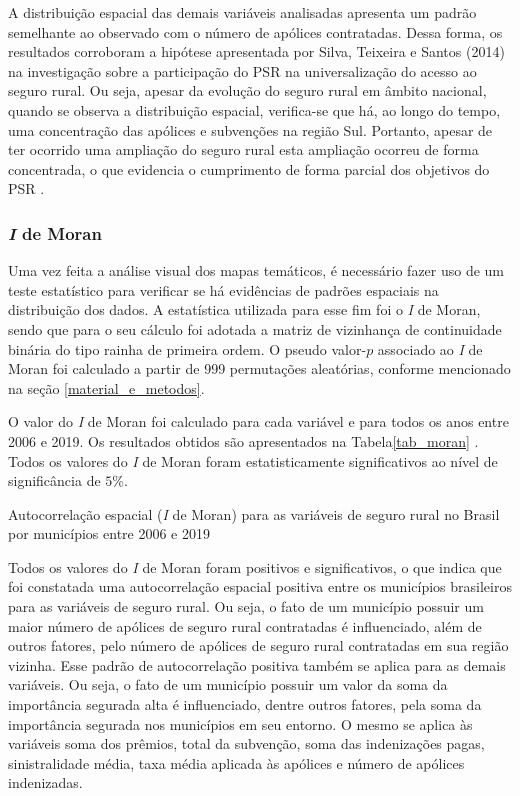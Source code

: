 A distribuição espacial das demais variáveis analisadas apresenta um padrão semelhante ao observado com o número de apólices contratadas. Dessa forma, os resultados corroboram a hipótese apresentada por Silva, Teixeira e Santos (2014) na investigação sobre a participação do PSR na universalização do acesso ao seguro rural. Ou seja, apesar da evolução do seguro rural em âmbito nacional, quando se observa a distribuição espacial, verifica-se que há, ao longo do tempo, uma concentração das apólices e subvenções na região Sul. Portanto, apesar de ter ocorrido uma ampliação do seguro rural esta ampliação ocorreu de forma concentrada, o que evidencia o cumprimento de forma parcial dos objetivos do PSR \cite{silva14}.


\subsubsection{\textit{I} de Moran}

Uma vez feita a análise visual dos mapas temáticos, é necessário fazer uso de um teste estatístico para verificar se há evidências de padrões espaciais na distribuição dos dados. A estatística utilizada para esse fim foi o \textit{I} de Moran, sendo que para o seu cálculo foi adotada a matriz de vizinhança de continuidade binária do tipo rainha de primeira ordem. O pseudo valor-$p$ associado ao \textit{I} de Moran foi calculado a partir de 999 permutações aleatórias, conforme mencionado na seção \ref{material_e_metodos}.

O valor do \textit{I} de Moran foi calculado para cada variável e para todos os anos entre 2006 e 2019. Os resultados obtidos são apresentados na Tabela\ref{tab_moran} . Todos os valores do \textit{I} de Moran foram estatisticamente significativos ao nível de significância de $5\%$. 


\begin{small}
\begin{table}[H]
\caption{Autocorrelação espacial (\textit{I} de Moran) para as variáveis de seguro rural no Brasil por municípios entre 2006 e 2019} \label{tab_moran}

\end{table}
\end{small}

Todos os valores do \textit{I} de Moran foram positivos e significativos, o que indica que foi constatada uma autocorrelação espacial positiva entre os municípios brasileiros para as variáveis de seguro rural. Ou seja, o fato de um município possuir um maior número de apólices de seguro rural contratadas é influenciado, além de outros fatores, pelo número de apólices de seguro rural contratadas em sua região vizinha. Esse padrão de autocorrelação positiva também se aplica para as demais variáveis. Ou seja, o fato de um município possuir um valor da soma da importância segurada alta é influenciado, dentre outros fatores, pela soma da importância segurada nos municípios em seu entorno. O mesmo se aplica às variáveis soma dos prêmios, total da subvenção, soma das indenizações pagas, sinistralidade média, taxa média aplicada às apólices e número de apólices indenizadas. 

